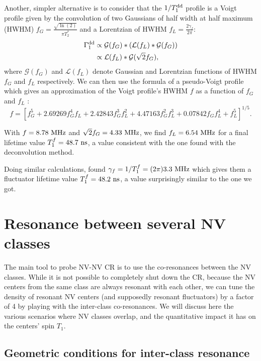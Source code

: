\documentclass[a4paper,11pt]{report}
\begin{document}
Another, simpler alternative is to consider that the $1/T_1^{\rm dd}$ profile is a Voigt profile given by the convolution of two Gaussians of half width at half maximum (HWHM) $f_G=\frac{\sqrt{\ln (2)}}{\pi T_2^*}$ and a Lorentzian of HWHM $f_L=\frac{2 \gamma_f}{2 \pi}$:
\begin{align*}
\Gamma_1^{\rm dd}&\propto \mathcal{G}(f_G)*(\mathcal{L}(f_L)*\mathcal{G}(f_G)) \\
&\propto \mathcal{L}(f_L)*\mathcal{G}(\sqrt{2} f_G),
\end{align*}
where $\mathcal{G}(f_G)$ and $\mathcal{L}(f_L)$ denote Gaussian and Lorentzian functions of HWHM $f_G$ and $f_L$ respectively.
We can then use the formula of a pseudo-Voigt profile which gives an approximation of the Voigt profile's HWHM $f$ as a function of $f_G$ and $f_L$ \citep{ida2000extended}:
\begin{equation}
f = [f_G^5 + 2.69269 f_G^4 f_L + 2.42843 f_G^3 f_L^2 + 4.47163 f_G^2 f_L^3 + 0.07842 f_G f_L^4 + f_L^5]^{1/5}.
\end{equation}

With $f=8.78\ \rm MHz$ and $\sqrt{2}f_G=4.33\ \rm MHz$, we find $f_L=6.54\ \rm MHz$ for a final lifetime value $T_1^f = 48.7\ \rm ns$, a value consistent with the one found with the deconvolution method.

Doing similar calculations, \citep{choi2017depolarization} found $\gamma_f=1/T_1^f=(2\pi) 3.3\ \rm MHz$ which gives them a fluctuator lifetime value $T_1^f = 48.2\ \rm ns$, a value surprisingly similar to the one we got.


\section{Resonance between several NV classes}

The main tool to probe NV-NV CR is to use the co-resonances between the NV classes. While it is not possible to completely shut down the CR, because the NV centers from the same class are always resonant with each other, we can tune the density of resonant NV centers (and supposedly resonant fluctuators) by a factor of 4 by playing with the inter-class co-resonances. We will discuss here the various scenarios where NV classes overlap, and the quantitative impact it has on the centers' spin $T_1$.

\subsection{Geometric conditions for inter-class resonance}
\end{document}
